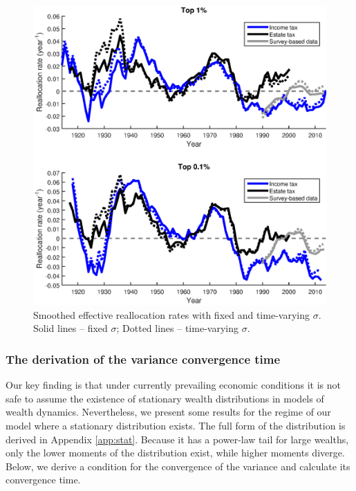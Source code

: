 \begin{figure}[!htb]
\centering
\includegraphics[width=1.0\textwidth] {./chapter_3/figs/sigma_fixed_notfixed_1_0i1.eps}
\caption{Smoothed effective reallocation rates with fixed and time-varying $\sigma$. Solid lines -- fixed $\sigma$; Dotted lines -- time-varying $\sigma$.}
\end{figure}

\clearpage

\subsubsection{The derivation of the variance convergence time}\label{app:var_conv}

Our key finding is that under currently prevailing economic conditions it is not safe to assume the existence of stationary wealth distributions in models of wealth dynamics. 
Nevertheless, we present some results for the regime of our model where a stationary distribution exists.
The full form of the distribution is derived in Appendix \ref{app:stat}. Because it has a power-law tail for large wealths, only the lower moments of the distribution exist, while higher moments diverge.
Below, we derive a condition for the convergence of the variance and calculate its convergence time.

